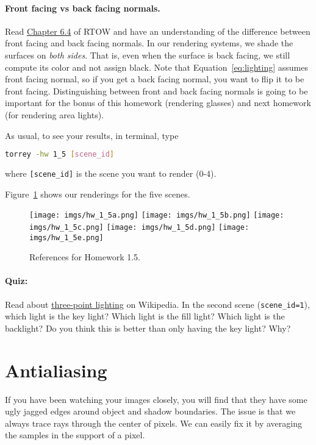 \paragraph{Front facing vs back facing normals.} Read \href{https://raytracing.github.io/books/RayTracingInOneWeekend.html#surfacenormalsandmultipleobjects/frontfacesversusbackfaces}{Chapter 6.4} of RTOW and have an understanding of the difference between front facing and back facing normals. In our rendering systems, we shade the surfaces on \emph{both sides}. That is, even when the surface is back facing, we still compute its color and not assign black. Note that Equation~\eqref{eq:lighting} assumes front facing normal, so if you get a back facing normal, you want to flip it to be front facing. Distinguishing between front and back facing normals is going to be important for the bonus of this homework (rendering glasses) and next homework (for rendering area lights).

As usual, to see your results, in terminal, type
\begin{lstlisting}[language=bash]
  torrey -hw 1_5 [scene_id]
\end{lstlisting}
where \lstinline{[scene_id]} is the scene you want to render (0-4).

Figure~\ref{fig:hw_1_5} shows our renderings for the five scenes.

\begin{figure}[ht]
    \centering
    \texttt{[image: imgs/hw\_1\_5a.png]}
    \texttt{[image: imgs/hw\_1\_5b.png]}
    \texttt{[image: imgs/hw\_1\_5c.png]}
    \texttt{[image: imgs/hw\_1\_5d.png]}
    \texttt{[image: imgs/hw\_1\_5e.png]}
    \caption{References for Homework 1.5.}
    \label{fig:hw_1_5}
\end{figure}

\paragraph{Quiz:} Read about \href{https://en.wikipedia.org/wiki/Three-point_lighting}{three-point lighting} on Wikipedia. In the second scene (\lstinline{scene_id=1}), which light is the key light? Which light is the fill light? Which light is the backlight? Do you think this is better than only having the key light? Why?

\section{Antialiasing}
If you have been watching your images closely, you will find that they have some ugly jagged edges around object and shadow boundaries. The issue is that we always trace rays through the center of pixels. We can easily fix it by averaging the samples in the support of a pixel.

